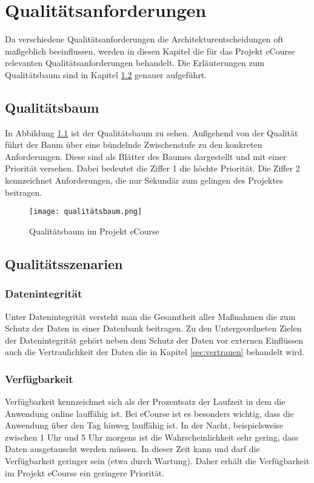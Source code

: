 \chapter{Qualitätsanforderungen}
Da verschiedene Qualitätsanforderungen die Architekturentscheidungen oft maßgeblich beeinflussen, werden in diesen Kapitel die für das Projekt eCourse relevanten Qualitätsanforderungen behandelt. Die Erläuterungen zum Qualitätsbaum sind in Kapitel \ref{sec:q2} genauer aufgeführt.

\section{Qualitätsbaum}
In Abbildung \ref{fib:baum} ist der Qualitätsbaum zu sehen. Außgehend von der Qualität führt der Baum über eine bündelnde Zwischenstufe zu den konkreten Anforderungen. Diese sind als Blätter des Baumes dargestellt und mit einer Priorität versehen. Dabei bedeutet die Ziffer 1 die höchte Priorität. Die Ziffer 2 kennzeichnet Anforderungen, die nur Sekundär zum gelingen des Projektes beitragen.

\begin{figure}[H]
\centering
\texttt{[image: qualitätsbaum.png]}
\caption{Qualitätsbaum im Projekt eCourse}
\label{fib:baum}
\end{figure}


\section{Qualitätsszenarien}
\label{sec:q2}
\subsection{Datenintegrität}
Unter Datenintegrität versteht man die Gesamtheit aller Maßnahmen die zum Schutz der Daten in einer Datenbank beitragen. Zu den Untergeordneten Zielen der Datenintegrität gehört neben dem Schutz der Daten vor externen Einflüssen auch die Vertraulichkeit der Daten die in Kapitel \ref{sec:vertrauen} behandelt wird.

\subsection{Verfügbarkeit}
Verfügbarkeit kennzeichnet sich als der Prozentsatz der Laufzeit in dem die Anwendung online lauffähig ist. Bei eCourse ist es besonders wichtig, dass die Anwendung über den Tag hinweg lauffähig ist. In der Nacht, beispielsweise zwischen 1 Uhr und 5 Uhr morgens ist die Wahrscheinlichkeit sehr gering, dass Daten ausgetauscht werden müssen. In dieser Zeit kann und darf die Verfügbarkeit geringer sein (etwa durch Wartung). Daher erhält die Verfügbarkeit im Projekt eCourse ein geringere Priorität.

